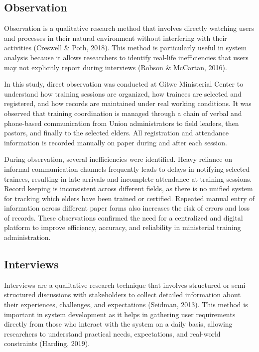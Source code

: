\documentclass[12pt]{report}
\begin{document}
\subsection*{Observation}
Observation is a qualitative research method that involves directly watching users and processes in their natural environment without interfering with their activities (Creswell \& Poth, 2018). This method is particularly useful in system analysis because it allows researchers to identify real-life inefficiencies that users may not explicitly report during interviews (Robson \& McCartan, 2016).

In this study, direct observation was conducted at Gitwe Ministerial Center to understand how training sessions are organized, how trainees are selected and registered, and how records are maintained under real working conditions. It was observed that training coordination is managed through a chain of verbal and phone-based communication from Union administrators to field leaders, then pastors, and finally to the selected elders. All registration and attendance information is recorded manually on paper during and after each session.

During observation, several inefficiencies were identified. Heavy reliance on informal communication channels frequently leads to delays in notifying selected trainees, resulting in late arrivals and incomplete attendance at training sessions. Record keeping is inconsistent across different fields, as there is no unified system for tracking which elders have been trained or certified. Repeated manual entry of information across different paper forms also increases the risk of errors and loss of records. These observations confirmed the need for a centralized and digital platform to improve efficiency, accuracy, and reliability in ministerial training administration.

\subsection*{Interviews}
Interviews are a qualitative research technique that involves structured or semi-structured discussions with stakeholders to collect detailed information about their experiences, challenges, and expectations (Seidman, 2013). This method is important in system development as it helps in gathering user requirements directly from those who interact with the system on a daily basis, allowing researchers to understand practical needs, expectations, and real-world constraints (Harding, 2019).
\end{document}
